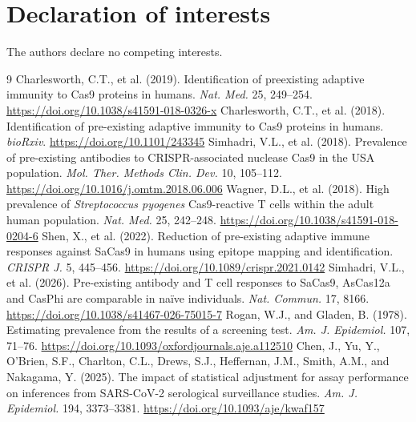 \documentclass[11pt]{article}
\begin{document}
\section*{Declaration of interests}
The authors declare no competing interests.

\begin{thebibliography}{9}
 Charlesworth, C.T., et al. (2019). Identification of preexisting adaptive immunity to Cas9 proteins in humans. \textit{Nat. Med.} 25, 249--254. \url{https://doi.org/10.1038/s41591-018-0326-x}
 Charlesworth, C.T., et al. (2018). Identification of pre-existing adaptive immunity to Cas9 proteins in humans. \textit{bioRxiv}. \url{https://doi.org/10.1101/243345}
 Simhadri, V.L., et al. (2018). Prevalence of pre-existing antibodies to CRISPR-associated nuclease Cas9 in the USA population. \textit{Mol. Ther. Methods Clin. Dev.} 10, 105--112. \url{https://doi.org/10.1016/j.omtm.2018.06.006}
 Wagner, D.L., et al. (2018). High prevalence of \textit{Streptococcus pyogenes} Cas9-reactive T cells within the adult human population. \textit{Nat. Med.} 25, 242--248. \url{https://doi.org/10.1038/s41591-018-0204-6}
 Shen, X., et al. (2022). Reduction of pre-existing adaptive immune responses against SaCas9 in humans using epitope mapping and identification. \textit{CRISPR J.} 5, 445--456. \url{https://doi.org/10.1089/crispr.2021.0142}
 Simhadri, V.L., et al. (2026). Pre-existing antibody and T cell responses to SaCas9, AsCas12a and CasPhi are comparable in na\"ive individuals. \textit{Nat. Commun.} 17, 8166. \url{https://doi.org/10.1038/s41467-026-75015-7}
 Rogan, W.J., and Gladen, B. (1978). Estimating prevalence from the results of a screening test. \textit{Am. J. Epidemiol.} 107, 71--76. \url{https://doi.org/10.1093/oxfordjournals.aje.a112510}
 Chen, J., Yu, Y., O'Brien, S.F., Charlton, C.L., Drews, S.J., Heffernan, J.M., Smith, A.M., and Nakagama, Y. (2025). The impact of statistical adjustment for assay performance on inferences from SARS-CoV-2 serological surveillance studies. \textit{Am. J. Epidemiol.} 194, 3373--3381. \url{https://doi.org/10.1093/aje/kwaf157}
\end{thebibliography}
\end{document}
